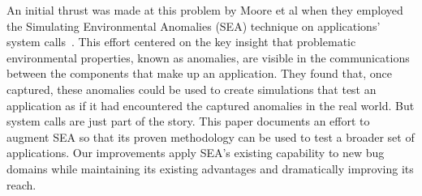 



An initial thrust was made at this problem by Moore et al
when they employed
the Simulating Environmental Anomalies (SEA) technique
on applications' system calls~\cite{crashsim}.
This effort centered on the key insight
that problematic
environmental properties,
known as anomalies, are visible in the
communications between the components that make up an application.
They found that,
once captured,
these anomalies
could be
used to create simulations
that test
an application as if
it had encountered the captured anomalies
in the real world.
But system calls are just part of the story.
This paper documents an effort to augment SEA
so that its proven methodology
can be used to test a broader set of applications.
Our improvements
apply SEA's existing capability
to new bug domains
while maintaining its existing advantages and
dramatically
improving its reach.


